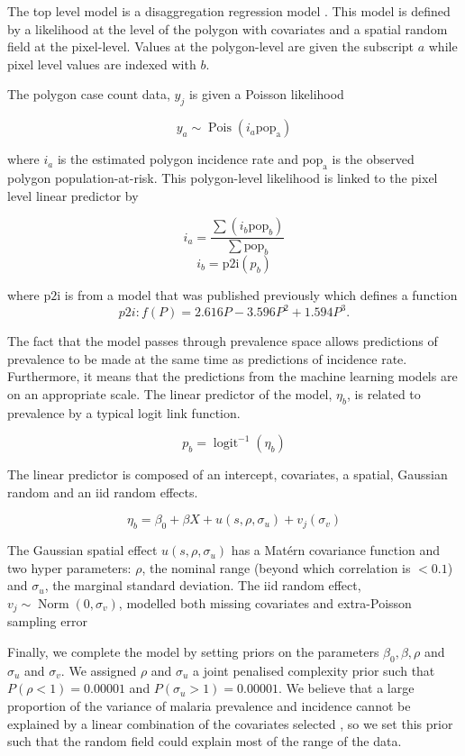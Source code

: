 \documentclass[11pt]{article}
\begin{document}
The top level model is a disaggregation regression model \citep{sturrock2014fine, wilson2017pointless, law2018variational, taylor2017continuous, li2012log}.
This model is defined by a likelihood at the level of the polygon with covariates and a spatial random field at the pixel-level. 
Values at the polygon-level are given the subscript $a$ while pixel level values are indexed with $b$.

The polygon case count data, $y_j$ is given a Poisson likelihood

$$y_a \sim \operatorname{Pois}(i_a\mathrm{pop_a})$$

where $i_a$ is the estimated polygon incidence rate and $\mathrm{pop_a}$ is the observed polygon population-at-risk. 
This polygon-level likelihood is linked to the pixel level linear predictor by 

$$i_a = \frac{ \sum(i_b \mathrm{pop}_b)}{\sum  \mathrm{pop}_b} $$
$$i_b = \mathrm{p2i}(p_b)$$

where $\mathrm{p2i}$ is from a model that was published previously \citep{cameron2015defining} which defines a function
$${p2i}: f\left(P\right) = 2.616P - 3.596P^2 + 1.594P^3.$$

The fact that the model passes through prevalence space allows predictions of prevalence to be made at the same time as predictions of incidence rate.
Furthermore, it means that the predictions from the machine learning models are on an appropriate scale.
The linear predictor of the model, $\eta_b$, is related to prevalence by a typical logit link function.

$$p_b = \operatorname{logit}^{-1}(\eta_b)$$

The linear predictor is composed of an intercept, covariates, a spatial, Gaussian random and an iid random effects.

$$\eta_b = \beta_0 + \beta X  + u(s, \rho, \sigma_u) + v_j(\sigma_v)$$

The Gaussian spatial effect $u(s, \rho, \sigma_u)$ has a Mat\'ern covariance function and two hyper parameters: $\rho$, the nominal range (beyond which correlation is $< 0.1$) and $\sigma_u$, the marginal standard deviation.
The iid random effect, $v_j \sim \operatorname{Norm}(0, \sigma_v)$, modelled both missing covariates and extra-Poisson sampling error

Finally, we complete the model by setting priors on the parameters $\beta_0, \beta, \rho$ and $\sigma_u$ and $\sigma_v$. We assigned $\rho$ and $\sigma_u$ a joint penalised complexity prior \citep{fuglstad2018constructing} such that $P(\rho < 1) = 0.00001$ and $P(\sigma_u > 1) = 0.00001$. 
We believe that a large proportion of the variance of malaria prevalence and incidence cannot be explained by a linear combination of the covariates selected \citep{bhatt2017improved}, so we set this prior such that the random field could explain most of the range of the data.
\end{document}
